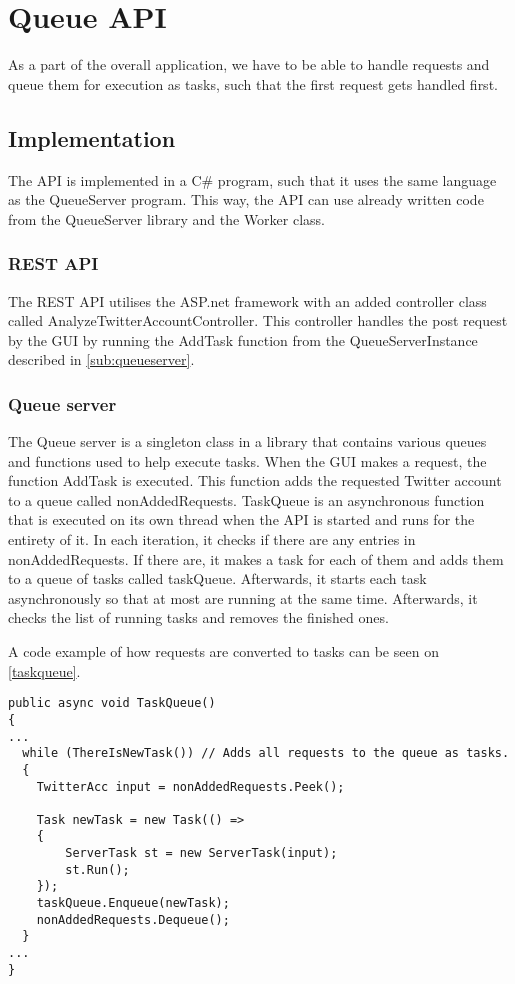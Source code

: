 \chapter{Queue \ac{API}}\label{queueAPI}
As a part of the overall application, we have to be able to handle requests
and queue them for execution as tasks, such that the first request gets handled
first.

\section{Implementation}
The \ac{API} is implemented in a C\# program, such that it uses the same
language as the QueueServer program. This way, the \ac{API} can use already
written code from the QueueServer library and the Worker class.

\subsection{\ac{REST} \ac{API}}
The \ac{REST} \ac{API} utilises the ASP.net framework with an added controller
class called AnalyzeTwitterAccountController. This controller handles the post
request by the GUI by running the AddTask function from the QueueServerInstance
described in \autoref{sub:queueserver}.

\subsection{Queue server} \label{sub:queueserver}
The Queue server is a singleton class in a library that contains various
queues and functions used to help execute tasks. When the GUI makes a request,
the function AddTask is executed. This function adds the requested Twitter
account to a queue called nonAddedRequests. TaskQueue is an asynchronous
function that is executed on its own thread when the \ac{API} is started and runs for
the entirety of it. In each iteration, it checks if there are any entries in
nonAddedRequests. If there are, it makes a task for each of them and adds them
to a queue of tasks called taskQueue. Afterwards, it starts each task
asynchronously so that at most 
are running at the same time. Afterwards, it checks the list of
running tasks and removes the finished ones. \nl

A code example of how requests are converted to tasks can be seen on
\autoref{taskqueue}. \\

\begin{minipage}[H]{\linewidth}
\begin{lstlisting}[caption = Adding tasks to the queue, label = taskqueue] 
public async void TaskQueue()
{
...
  while (ThereIsNewTask()) // Adds all requests to the queue as tasks.
  {
	TwitterAcc input = nonAddedRequests.Peek();
	
	Task newTask = new Task(() =>
	{
	    ServerTask st = new ServerTask(input);
	    st.Run();
	});
	taskQueue.Enqueue(newTask);
	nonAddedRequests.Dequeue();
  }
...  
}

\end{lstlisting}
\end{minipage}

